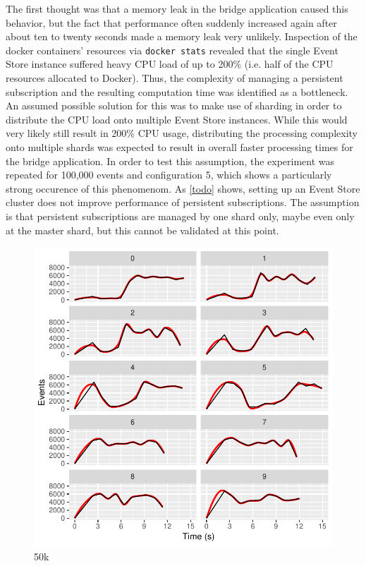 The first thought was that a memory leak in the bridge application caused this behavior, but the fact that performance often suddenly increased again after about ten to twenty seconds made a memory leak very unlikely.
Inspection of the docker containers' resources via \texttt{docker stats} revealed that the single Event Store instance suffered heavy CPU load of up to 200\% (i.e. half of the CPU resources allocated to Docker).
Thus, the complexity of managing a persistent subscription and the resulting computation time was identified as a bottleneck.
An assumed possible solution for this was to make use of sharding in order to distribute the CPU load onto multiple Event Store instances.
While this would very likely still result in 200\% CPU usage, distributing the processing complexity onto multiple shards was expected to result in overall faster processing times for the bridge application.
In order to test this assumption, the experiment was repeated for 100,000 events and configuration 5, which shows a particularly strong occurence of this phenomenom.
As \cref{todo} shows, setting up an Event Store cluster does not improve performance of persistent subscriptions.
The assumption is that persistent subscriptions are managed by one shard only, maybe even only at the master shard, but this cannot be validated at this point.


\begin{figure}[htb]
        \includegraphics[width=\textwidth]{gfx/config-comparison_50k.pdf}
        \caption{50k}
        \label{fig:evaluation:performance:config-comparison_50k}
\end{figure}

